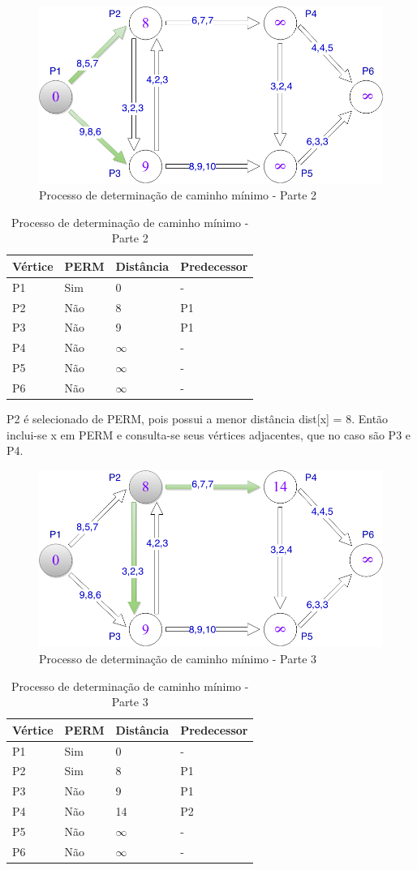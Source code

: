 \begin{figure}[htbp]
\centering
 \includegraphics[width=.50\textwidth]{figuras/leo3.png}
\caption{Processo de determinação de caminho mínimo - Parte 2}
\label{fig:leo3}
\end{figure}

\begin{table}[htbp]
  \centering
  \begin{tabular}{l l l l}
  \toprule
  Vértice & PERM & Distância & Predecessor\\
  \midrule
  P1 & Sim & 0 & - \\
  P2 & Não & 8 & P1 \\
  P3 & Não & 9 & P1 \\
  P4 & Não & $\infty$ & - \\
  P5 & Não & $\infty$ & - \\
  P6 & Não & $\infty$ & - \\
  \bottomrule
  \end{tabular}
\caption{Processo de determinação de caminho mínimo - Parte 2}
 \label{tab:leotab2}
\end{table}
\FloatBarrier

P2 é selecionado de PERM, pois possui a menor distância dist[x] = 8. Então inclui-se x em PERM e consulta-se
seus vértices adjacentes, que no caso são P3 e P4.

\begin{figure}[htbp]
\centering
 \includegraphics[width=.50\textwidth]{figuras/leo4.png}
\caption{Processo de determinação de caminho mínimo - Parte 3}
\label{fig:leo4}
\end{figure}
\FloatBarrier

\begin{table}[htbp]
  \centering
  \begin{tabular}{l l l l}
  \toprule
  Vértice & PERM & Distância & Predecessor\\
  \midrule
  P1 & Sim & 0 & - \\
  P2 & Sim & 8 & P1 \\
  P3 & Não & 9 & P1 \\
  P4 & Não & 14 & P2 \\
  P5 & Não & $\infty$ & - \\
  P6 & Não & $\infty$ & - \\
  \bottomrule
  \end{tabular}
\caption{Processo de determinação de caminho mínimo - Parte 3}
 \label{tab:leotab3}
\end{table}
\FloatBarrier

